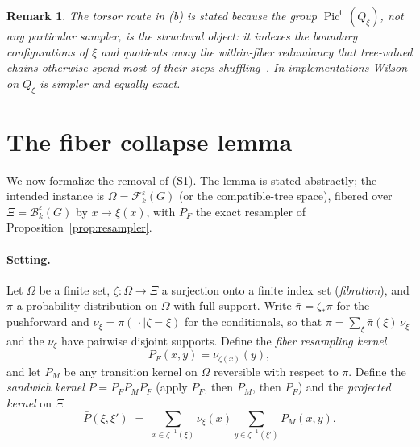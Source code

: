 \documentclass[11pt]{article}
\newcommand{\PicO}[1]{\operatorname{Pic}^0(#1)}
\newcommand{\Fcal}{\mathcal{F}}
\newcommand{\Bcal}{\mathcal{B}}
\newtheorem{remark}[theorem]{Remark}
\begin{document}
\begin{remark}
The torsor route in (b) is stated because the group $\PicO{Q_\xi}$, not
any particular sampler, is the structural object: it indexes the
\emph{boundary configurations} of $\xi$ and quotients away the within-fiber
redundancy that tree-valued chains otherwise spend most of their steps
shuffling~\cite{mew}. In implementations Wilson on $Q_\xi$ is simpler and
equally exact.
\end{remark}

\section{The fiber collapse lemma}
\label{sec:collapse}

We now formalize the removal of (S1). The lemma is stated
abstractly; the intended instance is $\Omega = \Fcal_k^\varepsilon(G)$ (or
the compatible-tree space), fibered over
$\Xi = \Bcal_k^\varepsilon(G)$ by $x \mapsto \xi(x)$, with $P_F$ the exact
resampler of Proposition~\ref{prop:resampler}.

\paragraph{Setting.} Let $\Omega$ be a finite set, $\zeta : \Omega \to \Xi$
a surjection onto a finite index set (\emph{fibration}), and $\pi$ a
probability distribution on $\Omega$ with full support. Write
$\bar\pi = \zeta_* \pi$ for the pushforward and
$\nu_\xi = \pi(\,\cdot \mid \zeta = \xi)$ for the conditionals, so that
$\pi = \sum_{\xi} \bar\pi(\xi)\, \nu_\xi$ and the $\nu_\xi$ have pairwise
disjoint supports. Define the \emph{fiber resampling kernel}
\[
  P_F(x, y) = \nu_{\zeta(x)}(y),
\]
and let $P_M$ be any transition kernel on $\Omega$ reversible with respect
to $\pi$. Define the \emph{sandwich kernel} $P = P_F P_M P_F$ (apply $P_F$,
then $P_M$, then $P_F$) and the \emph{projected kernel} on $\Xi$
\[
  \bar{P}(\xi, \xi') \;=\; \sum_{x \in \zeta^{-1}(\xi)} \nu_\xi(x)
    \sum_{y \in \zeta^{-1}(\xi')} P_M(x, y).
\]
\end{document}
